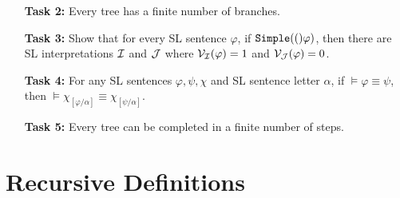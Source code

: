 \documentclass[a4paper, 11pt]{article} %
\begin{document}
\begin{enumerate}
  \item[\bf Task 2:] Every tree has a finite number of branches.
  \item[\bf Task 3:] Show that for every SL sentence $\varphi$, if $\texttt{Simple}(()\varphi)$, then there are SL interpretations $\mathcal{I}$ and $\mathcal{J}$ where $\mathcal{V}_{\mathcal{I}}(\varphi)=1$ and $\mathcal{V}_{\mathcal{J}}(\varphi)=0$. 
  \item[\bf Task 4:] For any SL sentences $\varphi,\psi,\chi$ and SL sentence letter $\alpha$, if $\vDash \varphi \equiv \psi$, then $\vDash \chi_{[\varphi/\alpha]}\equiv\chi_{[\psi/\alpha]}$.
  \item[\bf Task 5:] Every tree can be completed in a finite number of steps.
\end{enumerate}




\section*{Recursive Definitions}
\end{document}
